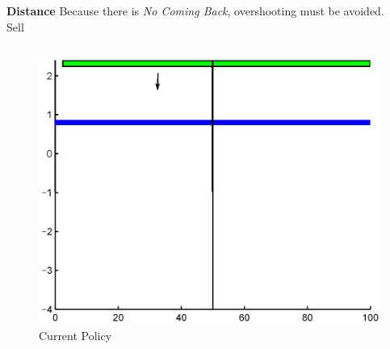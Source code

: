 \documentclass{beamer}
\begin{document}
\begin{frame}
{\bf Distance}
Because there is \textit{No Coming Back}, overshooting must be avoided. \\

{\large Sell}
\begin{columns}
\begin{figure}[hbt]
  \includegraphics[scale = 0.4]{Where2Move0step.eps}
  \caption{Current Policy}
\end{figure}
\end{columns}
\end{frame}
\end{document}
